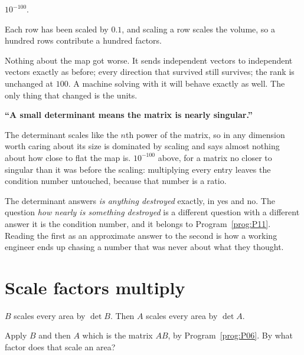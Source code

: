 \begin{fr}
\begin{ansblock}
$10^{-100}$.
\end{ansblock}

Each row has been scaled by $\num{0.1}$, and scaling a row scales the volume,
so a hundred rows contribute a hundred factors.

Nothing about the map got worse. It sends independent vectors to independent
vectors exactly as before; every direction that survived still survives; the
rank is unchanged at $100$. A machine solving with it will behave exactly as
well. The only thing that changed is the units.
\end{fr}

\begin{trapbox}
\textbf{\enquote{A small determinant means the matrix is nearly singular.}}

The determinant scales like the $n$th power of the matrix, so in any dimension
worth caring about its size is dominated by scaling and says almost nothing
about how close to flat the map is. $10^{-100}$ above, for a matrix no closer
to singular than it was before the scaling: multiplying every entry leaves the
condition number untouched, because that number is a ratio.

The determinant answers \emph{is anything destroyed} exactly, in yes and no.
The question \emph{how nearly is something destroyed} is a different question
with a different answer \dash{} it is the condition number, and it belongs to
Program~\ref{prog:P11}. Reading the first as an approximate answer to the
second is how a working engineer ends up chasing a number that was never about
what they thought.
\end{trapbox}

\section{Scale factors multiply}
\label{sec:P09-product}

\begin{fr}
$B$ scales every area by $\det B$. Then $A$ scales every area by $\det A$.

Apply $B$ and then $A$ \dash{} which is the matrix $AB$, by
Program~\ref{prog:P06}. By what factor does that scale an area?
\dotline
\nextframe
\end{fr}


